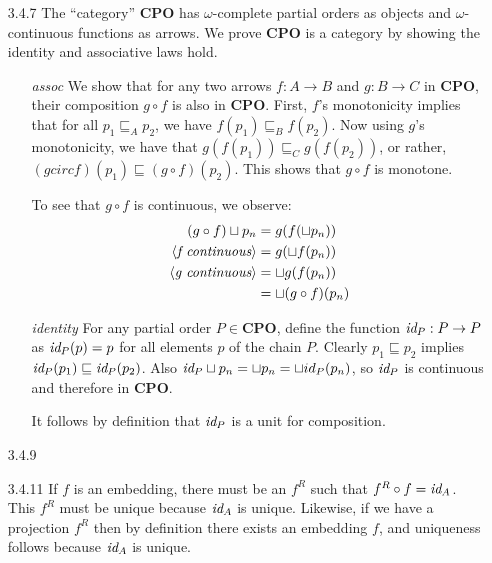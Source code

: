 \documentclass{article}
\newcommand{\cpo}{\mathbf{CPO}}
\newcommand{\id}{\emph{id}}
\begin{document}
\begin{enumerate}
\item[3.4.7]
  The ``category'' $\cpo$ has $\omega$-complete partial orders as objects and $\omega$-continuous functions as arrows.
  We prove $\cpo$ is a category by showing the identity and associative laws hold.
  \begin{itemize}
  \item[\emph{assoc}]
    We show that for any two arrows $f : A \rightarrow B$ and $g : B \rightarrow C$ in $\cpo$, their composition $g \circ f$ is also in $\cpo$.
    First, $f$'s monotonicity implies that for all $p_1 \sqsubseteq_A p_2$, we have $f(p_1) \sqsubseteq_B f(p_2)$.
    Now using $g$'s monotonicity, we have that $g(f(p_1)) \sqsubseteq_C g(f(p_2))$, or rather, $(g circ f)(p_1) \sqsubseteq (g \circ f)(p_2)$.
    This shows that $g \circ f$ is monotone.
    
    To see that $g \circ f$ is continuous, we observe:
    \begin{align*}
      (g \circ f) \sqcup p_n &= g(f(\sqcup p_n))
    \\\langle\emph{f continuous}\rangle    &= g(\sqcup f(p_n))
    \\\langle\emph{g continuous}\rangle    &= \sqcup g(f(p_n))
    \\                       &= \sqcup (g \circ f)(p_n)
    \end{align*}

  \item[\emph{identity}]
    For any partial order $P \in \cpo$, define the function $\id_P : P \rightarrow P$ as $\id_P(p) = p$ for all elements $p$ of the chain $P$.
    Clearly $p_1 \sqsubseteq p_2$ implies $\id_P(p_1) \sqsubseteq \id_P(p_2)$.
    Also $\id_P \sqcup p_n = \sqcup p_n = \sqcup id_P(p_n)$, so $\id_P$ is continuous and therefore in $\cpo$.

    It follows by definition that $\id_P$ is a unit for composition.
  \end{itemize}

\item[3.4.9]
\item[3.4.11]
  If $f$ is an embedding, there must be an $f^R$ such that $f^R \circ f = \id_A$.
  This $f^R$ must be unique because $\id_A$ is unique.
  Likewise, if we have a projection $f^R$ then by definition there exists an embedding $f$, and uniqueness follows because $\id_A$ is unique.

\end{enumerate}
\end{document}
